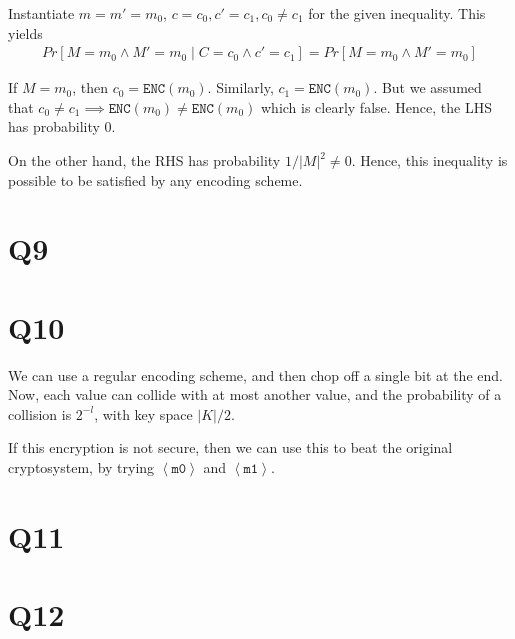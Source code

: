 \documentclass[11pt]{article}
\newcommand{\pr}[1]{Pr \left[ #1 \right]}
\newcommand{\prcond}[2]{Pr \left[ #1 \mid #2 \right]}
\newcommand{\enc}{\texttt{ENC}}
\newcommand{\bits}[1]{\left\langle \texttt{#1} \right\rangle}
\begin{document}
Instantiate $m = m' = m_0$, $c = c_0, c' = c_1, c_0 \neq c_1$
for the given inequality. This yields
\begin{align*}
    \prcond{M=m_0 \land M'=m_0}{C=c_0 \land c' =c_1} = \pr{M=m_0 \land M'=m_0}
\end{align*}

If $M=m_0$, then $c_0 = \enc(m_0)$. Similarly, $c_1 = \enc(m_0)$. But we
assumed that $c_0 \neq c_1 \implies \enc(m_0) \neq \enc(m_0)$ which is
clearly false. Hence, the LHS has probability 0.

On the other hand, the RHS has probability $1/|M|^2 \neq 0$. Hence, this
inequality is possible to be satisfied by any encoding scheme.

\section{Q9}

\section{Q10}

We can use a regular encoding scheme, and then chop off a single bit at the
end. Now, each value can collide with at most another value, and the
probability of a collision is $2^{-l}$, with key space $|K|/2$.

If this encryption is not secure, then we can use this to beat the
original cryptosystem, by trying $\bits{m0}$ and $\bits{m1}$.

\section{Q11}

\section{Q12}
\end{document}
